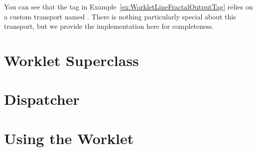 
You can see that the tag in Example~\ref{ex:WorkletLineFractalOutputTag} relies on a custom transport named .
There is nothing particularly special about this transport, but we provide the implementation here for completeness.


\section{Worklet Superclass}
\label{sec:NewWorkletTypes:WorkletSuperclass}
\label{sec:WorkletSuperclass}

\section{Dispatcher}
\label{sec:NewWorkletTypes:Dispatcher}



\section{Using the Worklet}
\label{sec:NewWorkletTypes:Using}



